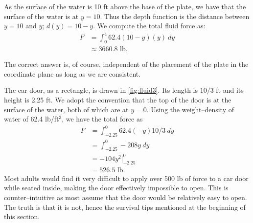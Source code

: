 {\begin{enumerate}
	As the surface of the water is 10 ft above the base of the plate, we have that the surface of the water is at $y=10$. Thus the depth function is the distance between $y=10$ and $y$; $d(y) = 10-y$. We compute the total fluid force as:
	\begin{align*}
	F	&=\int_0^4 62.4(10-y)(y)\ dy \\
		&\approx 3660.8\text{ lb}.
	\end{align*}
\end{enumerate}
The correct answer is, of course, independent of the placement of the plate in the coordinate plane as long as we are consistent.}

{The car door, as a rectangle, is drawn in \autoref{fig:fluid3}. Its length is $10/3$ ft and its height is 2.25 ft. We adopt the convention that the top of the door is at the surface of the water, both of which are at $y=0$. Using the weight--density of water of 62.4 lb/ft$^3$, we have the total force as
%
%
\begin{align*}
	F &=	\int_{-2.25}^0 62.4(-y)10/3\ dy \\
	&= 	\int_{-2.25}^0 -208y\ dy\\
	&= -104y^2\Big|_{-2.25}^0 \\
	&=	526.5 \text{ lb.}
\end{align*}
Most adults would find it very difficult to apply over 500 lb of force to a car door while seated inside, making the door effectively impossible to open. This  is  counter--intuitive as most assume that the door would be relatively easy to open. The truth is that it is not, hence the survival tips mentioned at the beginning of this section.}


